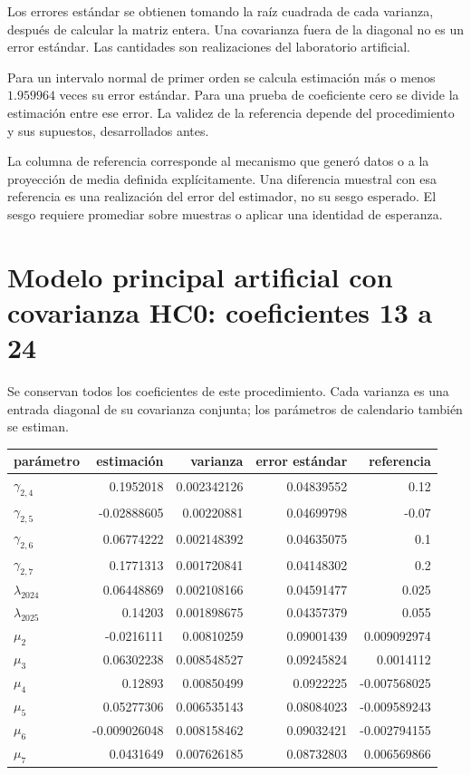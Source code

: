 \documentclass[11pt,a4paper]{article}
\begin{document}
Los errores estándar se obtienen tomando la raíz cuadrada de cada varianza, después de calcular la matriz entera. Una covarianza fuera de la diagonal no es un error estándar. Las cantidades son realizaciones del laboratorio artificial.

Para un intervalo normal de primer orden se calcula estimación más o menos $1.959964$ veces su error estándar. Para una prueba de coeficiente cero se divide la estimación entre ese error. La validez de la referencia depende del procedimiento y sus supuestos, desarrollados antes.

La columna de referencia corresponde al mecanismo que generó datos o a la proyección de media definida explícitamente. Una diferencia muestral con esa referencia es una realización del error del estimador, no su sesgo esperado. El sesgo requiere promediar sobre muestras o aplicar una identidad de esperanza.

\clearpage
\section{Modelo principal artificial con covarianza HC0: coeficientes 13 a 24}
Se conservan todos los coeficientes de este procedimiento. Cada varianza es una entrada diagonal de su covarianza conjunta; los parámetros de calendario también se estiman.
\begin{center}\small
\begin{tabular}{lrrrr}
\toprule
parámetro & estimación & varianza & error estándar & referencia\\\midrule
$\gamma_{2,4}$ & 0.1952018 & 0.002342126 & 0.04839552 & 0.12\\
$\gamma_{2,5}$ & -0.02888605 & 0.00220881 & 0.04699798 & -0.07\\
$\gamma_{2,6}$ & 0.06774222 & 0.002148392 & 0.04635075 & 0.1\\
$\gamma_{2,7}$ & 0.1771313 & 0.001720841 & 0.04148302 & 0.2\\
$\lambda_{2024}$ & 0.06448869 & 0.002108166 & 0.04591477 & 0.025\\
$\lambda_{2025}$ & 0.14203 & 0.001898675 & 0.04357379 & 0.055\\
$\mu_2$ & -0.0216111 & 0.00810259 & 0.09001439 & 0.009092974\\
$\mu_3$ & 0.06302238 & 0.008548527 & 0.09245824 & 0.0014112\\
$\mu_4$ & 0.12893 & 0.00850499 & 0.0922225 & -0.007568025\\
$\mu_5$ & 0.05277306 & 0.006535143 & 0.08084023 & -0.009589243\\
$\mu_6$ & -0.009026048 & 0.008158462 & 0.09032421 & -0.002794155\\
$\mu_7$ & 0.0431649 & 0.007626185 & 0.08732803 & 0.006569866\\
\bottomrule
\end{tabular}\end{center}
\end{document}
